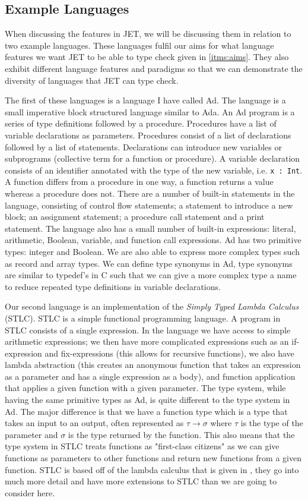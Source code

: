 \subsection{Example Languages}
\label{sec:exampleLanguages}
When discussing the features in JET, we will be discussing them in relation to two example languages.
These languages fulfil our aims for what language features we want JET to be able to type check given in \autoref{itms:aims}.
They also exhibit different language features and paradigms so that we can demonstrate the diversity of languages that JET can type check.

The first of these languages is a language I have called Ad.
The language is a small imperative block structured language similar to Ada.
An Ad program is a series of type definitions followed by a procedure.
Procedures have a list of variable declarations as parameters.
Procedures consist of a list of declarations followed by a list of statements.
Declarations can introduce new variables or subprograms (collective term for a function or procedure).
A variable declaration consists of an identifier annotated with the type of the new variable, i.e. \texttt{x : Int}.
A function differs from a procedure in one way, a function returns a value whereas a procedure does not.
There are a number of built-in statements in the language, consisting of control flow statements; a statement to introduce a new block; an assignment statement; a procedure call statement and a print statement. 
The language also has a small number of built-in expressions: literal, arithmetic, Boolean, variable, and function call expressions.
Ad has two primitive types: integer and Boolean.
We are also able to express more complex types such as record and array types.
We can define type synonyms in Ad, type synonyms are similar to typedef's in C such that we can give a more complex type a name to reduce repeated type definitions in variable declarations.

Our second language is an implementation of the \textit{Simply Typed Lambda Calculus} (STLC).
STLC is a simple functional programming language.
A program in STLC consists of a single expression.
In the language we have access to simple arithmetic expressions; we then have more complicated expressions such as an if-expression and fix-expressions (this allows for recursive functions), we also have lambda abstraction (this creates an anonymous function that takes an expression as a parameter and has a single expression as a body), and function application that applies a given function with a given parameter.
The type system, while having the same primitive types as Ad, is quite different to the type system in Ad.
The major difference is that we have a function type which is a type that takes an input to an output, often represented as $\tau \rightarrow \sigma$ where $\tau$ is the type of the parameter and $\sigma$ is the type returned by the function.
This also means that the type system in STLC treats functions as "first-class citizens" as we can give functions as parameters to other functions and return new functions from a given function.
STLC is based off of the lambda calculus that is given in \textcite{pierce2002types}, they go into much more detail and have more extensions to STLC than we are going to consider here.

